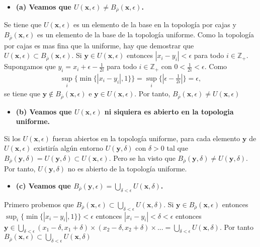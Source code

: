 \documentclass{article}
\newcommand{\vect}[1]{\boldsymbol{#1}}
\begin{document}
\begin{itemize}
\item \bf (a) \rm Veamos que $U(\vect{x},\epsilon)\neq B_{\overline{\rho}}(\vect{x},\epsilon)$.
\end{itemize}
Se tiene que $U(\vect{x},\epsilon)$ es un elemento de la base en la topología por cajas y $B_{\overline{\rho}}(\vect{x},\epsilon)$ es un elemento de la base de la topología uniforme. Como la topología por cajas es mas fina que la uniforme, hay que demostrar que $U(\vect{x},\epsilon)\subset B_{\overline{\rho}}(\vect{x},\epsilon)$. Si $\vect{y}\in U(\vect{x},\epsilon)$ entonces $|x_i-y_i|<\epsilon$ para todo $i\in\mathbb{Z}_{+}$. Supongamos que $y_i=x_i+\epsilon-\frac{1}{2i}$ para todo $i\in\mathbb{Z}_{+}$ con $0<\frac{1}{2i}<\epsilon$. Como \begin{eqnarray}
\sup_i\{\min\{|x_i-y_i|,1\}\}=\sup_i\{|\epsilon-\frac{1}{2i}|\}=\epsilon,\nonumber
\end{eqnarray}
se tiene que $\vect{y}\notin B_{\overline{\rho}}(\vect{x},\epsilon)$ e $\vect{y}\in U(\vect{x},\epsilon)$. Por tanto, $B_{\overline{\rho}}(\vect{x},\epsilon)\neq U(\vect{x},\epsilon)$
\begin{itemize}
\item \bf(b) \rm Veamos que $U(\vect{x},\epsilon)$ ni siquiera es abierto en la topologia uniforme.
\end{itemize}
Si los $U(\vect{x},\epsilon)$ fueran abiertos en la topología uniforme, para cada elemento $\vect{y}$ de $U(\vect{x},\epsilon)$ existiría algún entorno $ U(\vect{y},\delta)$ con $\delta>0$ tal que $B_{\overline{\rho}}(\vect{y},\delta)= U(\vect{y},\delta)\subset U(\vect{x},\epsilon)$. Pero se ha visto que $B_{\overline{\rho}}(\vect{y},\delta)\neq U(\vect{y},\delta)$. Por tanto, $U(\vect{y},\delta)$ no es abierto de la topología uniforme.
\begin{itemize}
\item \bf(c) \rm Veamos que $B_{\overline{\rho}}(\vect{y},\epsilon)=\bigcup_{\delta<\epsilon}U(\vect{x},\delta)$.
\end{itemize}
Primero probemos que $B_{\overline{\rho}}(\vect{x},\epsilon)\subset\bigcup_{\delta<\epsilon}U(\vect{x},\delta)$. Si $\vect{y}\in B_{\overline{\rho}}(\vect{x},\epsilon)$ entonces 
$\sup_i\{\min\{|x_i-y_i|,1\}\}<\epsilon$ entonces $|x_i-y_i|<\delta<\epsilon$ entonces $\vect{y}\in \bigcup_{\delta<\epsilon} (x_1-\delta,x_1+\delta)\times (x_2-\delta,x_2+\delta)\times ...=\bigcup_{\delta<\epsilon}U(\vect{x},\delta)$. Por tanto $B_{\overline{\rho}}(\vect{x},\epsilon)\subset\bigcup_{\delta<\epsilon}U(\vect{x},\delta)$
\end{document}
